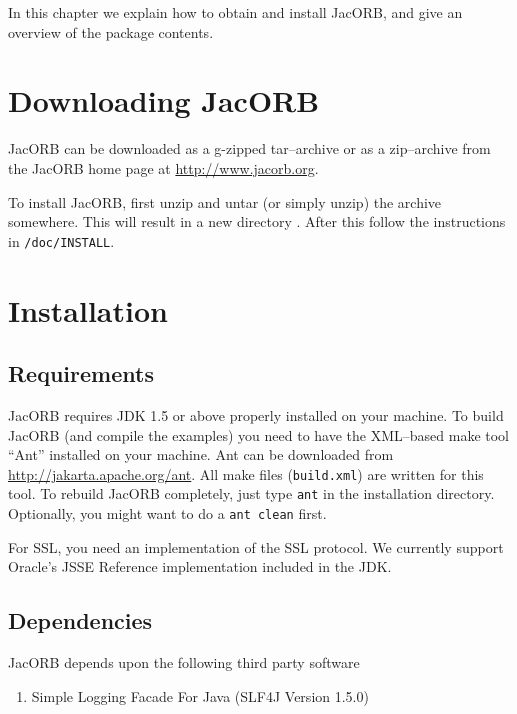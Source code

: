 
In this chapter  we explain how to obtain and  install JacORB, and give
an overview of the package contents.

\section{Downloading JacORB}


JacORB can be downloaded as a g-zipped tar--archive or as a zip--archive
from the  JacORB home page  at
\href{http://www.jacorb.org}{http://www.jacorb.org}.

To install JacORB, first unzip  and untar (or simply unzip) the archive
somewhere.  This will result  in a new directory {\tt \JacORBDir}.
After this follow the instructions in {\tt \JacORBDir/doc/INSTALL}.

\section{Installation}
\label{Sec_installation}

\subsection{Requirements}

JacORB requires JDK 1.5 or above properly installed on your machine.  To build
JacORB (and compile the examples) you need to have the XML--based make tool
``Ant'' installed on your machine.  Ant can be downloaded from
\href{http://jakarta.apache.org/ant}{http://jakarta.apache.org/ant}. All make
files ({\tt build.xml}) are written for this tool. To rebuild JacORB
completely, just type {\tt ant} in the installation directory.  Optionally,
you might want to do a {\tt ant clean} first.

For SSL, you need an implementation of the SSL protocol. We currently support
Oracle's JSSE Reference implementation included in the JDK.

\subsection{Dependencies}

JacORB depends upon the following third party software
\begin{enumerate}
\item Simple Logging Facade For Java (SLF4J Version 1.5.0)
\end{enumerate}


